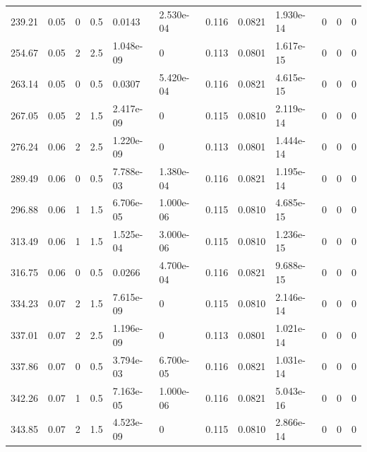\documentclass[preview]{standalone}
\begin{document}
{{\begin{tabular}{L{1.2cm}C{1.2cm} C{0.3cm}C{0.5cm} C{1.4cm}C{1.4cm} C{1.4cm}C{1.4cm} C{1.6cm}C{1.6cm} C{1.6cm}C{1.6cm}}
  239.21  &  0.05  & 0     & 0.5 &  0.0143  & 2.530e-04  &  0.116&   0.0821& 1.930e-14 & 0   &  0 & 0  \\ 
  254.67  &  0.05  & 2     & 2.5 &  1.048e-09  & 0  &  0.113&   0.0801& 1.617e-15 & 0   &  0 & 0  \\ 
  263.14  &  0.05  & 0     & 0.5 &  0.0307  & 5.420e-04  &  0.116&   0.0821& 4.615e-15 & 0   &  0 & 0  \\ 
  267.05  &  0.05  & 2     & 1.5 &  2.417e-09  & 0  &  0.115&   0.0810& 2.119e-14 & 0   &  0 & 0  \\ 
  276.24  &  0.06  & 2     & 2.5 &  1.220e-09  & 0  &  0.113&   0.0801& 1.444e-14 & 0   &  0 & 0  \\ 
  289.49  &  0.06  & 0     & 0.5 &  7.788e-03  & 1.380e-04  &  0.116&   0.0821& 1.195e-14 & 0   &  0 & 0  \\ 
  296.88  &  0.06  & 1     & 1.5 &  6.706e-05  & 1.000e-06  &  0.115&   0.0810& 4.685e-15 & 0   &  0 & 0  \\ 
  313.49  &  0.06  & 1     & 1.5 &  1.525e-04  & 3.000e-06  &  0.115&   0.0810& 1.236e-15 & 0   &  0 & 0  \\ 
  316.75  &  0.06  & 0     & 0.5 &  0.0266  & 4.700e-04  &  0.116&   0.0821& 9.688e-15 & 0   &  0 & 0  \\ 
  334.23  &  0.07  & 2     & 1.5 &  7.615e-09  & 0  &  0.115&   0.0810& 2.146e-14 & 0   &  0 & 0  \\ 
  337.01  &  0.07  & 2     & 2.5 &  1.196e-09  & 0  &  0.113&   0.0801& 1.021e-14 & 0   &  0 & 0  \\ 
  337.86  &  0.07  & 0     & 0.5 &  3.794e-03  & 6.700e-05  &  0.116&   0.0821& 1.031e-14 & 0   &  0 & 0  \\ 
  342.26  &  0.07  & 1     & 0.5 &  7.163e-05  & 1.000e-06  &  0.116&   0.0821& 5.043e-16 & 0   &  0 & 0  \\ 
  343.85  &  0.07  & 2     & 1.5 &  4.523e-09  & 0  &  0.115&   0.0810& 2.866e-14 & 0   &  0 & 0  \\ 
\hline 
\end{tabular} 

}}
\end{document}
